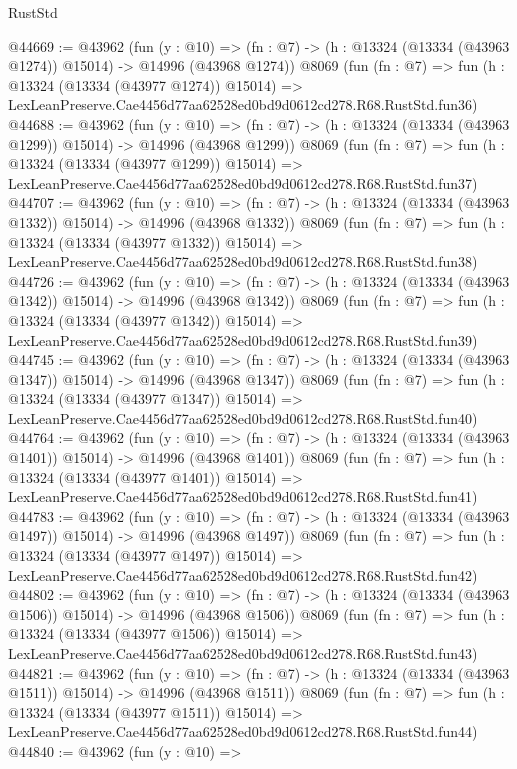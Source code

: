 \begin{lexlean}{RustStd}
\begin{coremodule}
@44669 := @43962
    (fun (y : @10) =>
    (fn : @7) -> (h : @13324 (@13334 (@43963 @1274)) @15014) -> @14996 (@43968 @1274))
    @8069
    (fun (fn : @7) =>
    fun (h : @13324 (@13334 (@43977 @1274)) @15014) =>
    LexLeanPreserve.Cae4456d77aa62528ed0bd9d0612cd278.R68.RustStd.fun36)
@44688 := @43962
    (fun (y : @10) =>
    (fn : @7) -> (h : @13324 (@13334 (@43963 @1299)) @15014) -> @14996 (@43968 @1299))
    @8069
    (fun (fn : @7) =>
    fun (h : @13324 (@13334 (@43977 @1299)) @15014) =>
    LexLeanPreserve.Cae4456d77aa62528ed0bd9d0612cd278.R68.RustStd.fun37)
@44707 := @43962
    (fun (y : @10) =>
    (fn : @7) -> (h : @13324 (@13334 (@43963 @1332)) @15014) -> @14996 (@43968 @1332))
    @8069
    (fun (fn : @7) =>
    fun (h : @13324 (@13334 (@43977 @1332)) @15014) =>
    LexLeanPreserve.Cae4456d77aa62528ed0bd9d0612cd278.R68.RustStd.fun38)
@44726 := @43962
    (fun (y : @10) =>
    (fn : @7) -> (h : @13324 (@13334 (@43963 @1342)) @15014) -> @14996 (@43968 @1342))
    @8069
    (fun (fn : @7) =>
    fun (h : @13324 (@13334 (@43977 @1342)) @15014) =>
    LexLeanPreserve.Cae4456d77aa62528ed0bd9d0612cd278.R68.RustStd.fun39)
@44745 := @43962
    (fun (y : @10) =>
    (fn : @7) -> (h : @13324 (@13334 (@43963 @1347)) @15014) -> @14996 (@43968 @1347))
    @8069
    (fun (fn : @7) =>
    fun (h : @13324 (@13334 (@43977 @1347)) @15014) =>
    LexLeanPreserve.Cae4456d77aa62528ed0bd9d0612cd278.R68.RustStd.fun40)
@44764 := @43962
    (fun (y : @10) =>
    (fn : @7) -> (h : @13324 (@13334 (@43963 @1401)) @15014) -> @14996 (@43968 @1401))
    @8069
    (fun (fn : @7) =>
    fun (h : @13324 (@13334 (@43977 @1401)) @15014) =>
    LexLeanPreserve.Cae4456d77aa62528ed0bd9d0612cd278.R68.RustStd.fun41)
@44783 := @43962
    (fun (y : @10) =>
    (fn : @7) -> (h : @13324 (@13334 (@43963 @1497)) @15014) -> @14996 (@43968 @1497))
    @8069
    (fun (fn : @7) =>
    fun (h : @13324 (@13334 (@43977 @1497)) @15014) =>
    LexLeanPreserve.Cae4456d77aa62528ed0bd9d0612cd278.R68.RustStd.fun42)
@44802 := @43962
    (fun (y : @10) =>
    (fn : @7) -> (h : @13324 (@13334 (@43963 @1506)) @15014) -> @14996 (@43968 @1506))
    @8069
    (fun (fn : @7) =>
    fun (h : @13324 (@13334 (@43977 @1506)) @15014) =>
    LexLeanPreserve.Cae4456d77aa62528ed0bd9d0612cd278.R68.RustStd.fun43)
@44821 := @43962
    (fun (y : @10) =>
    (fn : @7) -> (h : @13324 (@13334 (@43963 @1511)) @15014) -> @14996 (@43968 @1511))
    @8069
    (fun (fn : @7) =>
    fun (h : @13324 (@13334 (@43977 @1511)) @15014) =>
    LexLeanPreserve.Cae4456d77aa62528ed0bd9d0612cd278.R68.RustStd.fun44)
@44840 := @43962
    (fun (y : @10) =>

\end{coremodule}
\end{lexlean}
